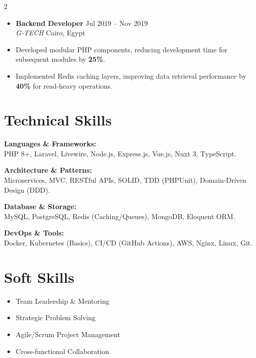 \documentclass[10pt, a4paper]{article}
\newcommand{\resumeItem}[1]{
  \item\small{
    {#1 \vspace{3pt}} %
  }
}
\newcommand{\resumeSubheading}[4]{
  \vspace{10pt} %
  \item
    \textbf{#1} \hfill {\footnotesize #2} \\ 
    \textit{\small #3} \hfill {\footnotesize #4} \\
    \vspace{4pt}
}
\begin{document}
\begin{paracol}{2}
\begin{itemize}[leftmargin=0.15in, label={}]
    \resumeSubheading
      {Backend Developer}{Jul 2019 -- Nov 2019}
      {G-TECH}{Cairo, Egypt}
      \resumeItem{Developed modular PHP components, reducing development time for subsequent modules by \textbf{25\%}.}
      \resumeItem{Implemented Redis caching layers, improving data retrieval performance by \textbf{40\%} for read-heavy operations.}

\end{itemize}

\switchcolumn

\section{Technical Skills}
\begin{itemize}[leftmargin=0.15in, label={}, itemsep=4pt]
    \small{
     \item \textbf{Languages \& Frameworks:} \\ PHP 8+, Laravel, Livewire, Node.js, Express.js, Vue.js, Nuxt 3, TypeScript.
     \item \textbf{Architecture \& Patterns:} \\ Microservices, MVC, RESTful APIs, SOLID, TDD (PHPUnit), Domain-Driven Design (DDD).
     \item \textbf{Database \& Storage:} \\ MySQL, PostgreSQL, Redis (Caching/Queues), MongoDB, Eloquent ORM.
     \item \textbf{DevOps \& Tools:} \\ Docker, Kubernetes (Basics), CI/CD (GitHub Actions), AWS, Nginx, Linux, Git.
    }
\end{itemize}

\section{Soft Skills}
\begin{itemize}[leftmargin=0.15in, label={}, itemsep=3pt]
    \small
    \item Team Leadership \& Mentoring
    \item Strategic Problem Solving
    \item Agile/Scrum Project Management
    \item Cross-functional Collaboration
\end{itemize}


\end{paracol}
\end{document}

